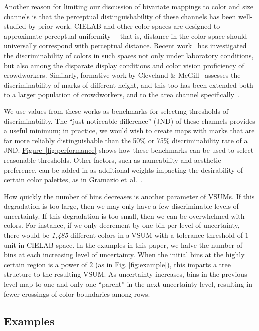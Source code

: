 \documentclass{vgtc}                          %
\newcommand{\figref}[1]{\hyperref[#1]{Figure~\ref*{#1}}}
\newcommand{\ea}{{et~al.}\xspace}
\begin{document}
Another reason for limiting our discussion of bivariate mappings to color and size channels is that the perceptual distinguishability of these channels has been well-studied by prior work. CIELAB and other color spaces are designed to approximate perceptual uniformity\,---\,that is, distance in the color space should universally correspond with perceptual distance. Recent work~\cite{stone2014engineering,szafir2014adapting} has investigated the discriminability of colors in such spaces not only under laboratory conditions, but also among the disparate display conditions and color vision proficiency of crowdworkers. Similarly, formative work by Cleveland \& McGill~\cite{cleveland1984graphical} assesses the discriminability of marks of different height, and this too has been extended both to a larger population of crowdworkers, and to the area channel specifically~\cite{heer2010crowdsourcing,talbot2014four}.

We use values from these works as benchmarks for selecting thresholds of discriminability. The ``just noticeable difference'' (JND) of these channels provides a useful minimum; in practice, we would wish to create maps with marks that are far more reliably distinguishable than the 50\% or 75\% discriminability rate of a JND. \figref{fig:performance} shows how these benchmarks can be used to select reasonable thresholds. Other factors, such as nameability and aesthetic preference, can be added in as additional weights impacting the desirability of certain color palettes, as in Gramazio \ea~\cite{gramazio2017colorgorical}.

How quickly the number of bins decreases is another parameter of VSUMs. If this degradation is too large, then we may only have a few discriminable levels of uncertainty. If this degradation is too small, then we can be overwhelmed with colors. For instance, if we only decrement by one bin per level of uncertainty, there would be \emph{1,485} different colors in a VSUM with a tolerance threshold of $1$ unit in CIELAB space. In the examples in this paper,  we halve the number of bins at each increasing level of uncertainty. When the initial bins at the highly certain region is a power of $2$ (as in Fig. \ref{fig:example}), this imparts a tree structure to the resulting VSUM. As uncertainty increases, bins in the previous level map to one and only one ``parent'' in the next uncertainty level, resulting in fewer crossings of color boundaries among rows.

\subsection{Examples}
\end{document}
